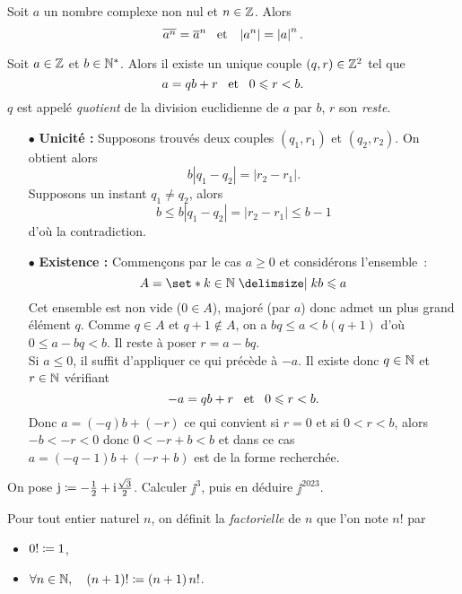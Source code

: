 \documentclass{magnoliaold}
\begin{document}
\begin{proposition}
Soit $a$ un nombre complexe non nul et $n\in\mathbb{Z}$. Alors
\[\overline{a^n}=\overline{a}^n \quad\!\text{et}\quad\! \left|a^n\right|=\left|a\right|^n.\]
\end{proposition}

\begin{definition}[nom={Division euclidienne}]
Soit $a\in\mathbb{Z}$ et $b\in{\mathbb{N}^*}$. Alors il existe un unique couple $\left(q,r\right)\in\mathbb{Z}^2$
tel que
\[a=qb+r \quad\!\text{et}\quad\! 0\leqslant r<b.\]
$q$ est appelé \emph{quotient} de la division euclidienne de $a$ par $b$, $r$ son
\emph{reste}.
\end{definition}

\begin{preuve}
\begin{itemize}
\item[$\bullet$] \textbf{Unicité :} Supposons trouvés deux couples $(q_1,r_1)$ et $(q_2,r_2)$. On obtient alors $$b|q_1-q_2|=|r_2-r_1|.$$ Supposons un instant $q_1\neq q_2$, alors $$b\leq b|q_1-q_2|=|r_2-r_1|\leq b-1$$ d'où la contradiction.
\item[$\bullet$] \textbf{Existence :} Commençons par le cas $a\geq 0$ et considérons l'ensemble~:
\[A=\enstq{k\in\N}{kb\leq a}\]
Cet ensemble est non vide ($0\in A$), majoré (par $a$) donc admet un plus grand
élément $q$. Comme $q\in A$ et $q+1 \notin A$, on a $bq\leq a <b(q+1)$ d'où $0\leq a-bq<b$. Il reste à poser $r=a-bq$.\\
Si $a\leq 0$, il suffit d'appliquer ce qui précède à $-a$. Il existe donc $q\in \mathbb{N}$ et $r\in \mathbb{N}$ vérifiant \[-a=qb+r \quad\!\text{et}\quad\! 0\leqslant r<b.\]
Donc $a=(-q)b+(-r)$ ce qui convient si $r=0$ et si $0<r<b$, alors $-b<-r<0$ donc $0<-r+b<b$ et dans ce cas $a=(-q-1)b+(-r+b)$ est de la forme recherchée.
\end{itemize}
\end{preuve}

\begin{exoUnique}
\exo On pose ${\rm j}\coloneqq-\frac{1}{2}+{\rm i}\frac{\sqrt{3}}{2}$. Calculer $\jj^3$, puis en déduire
  $\jj^{2023}$.
\end{exoUnique}
  

\begin{definition}[utile=-3]
Pour tout entier naturel $n$, on définit la \emph{factorielle} de $n$ que l'on note
$n!$ par
\begin{itemize}
\item $0!\coloneqq 1$,
\item $\forall n\in\mathbb{N} ,\quad \left(n+1\right)!\coloneqq\left(n+1\right)n!$.
\end{itemize}
\end{definition}
\end{document}
